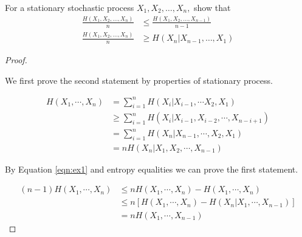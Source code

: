 \begin{exercise}{For a stationary stochastic process $X_{1}, X_{2}, \ldots, X_{n},$ show that
  $$
  \begin{aligned}
  \frac{H\left(X_{1}, X_{2}, \ldots, X_{n}\right)}{n} & \leq \frac{H\left(X_{1}, X_{2}, \ldots, X_{n-1}\right)}{n-1} \\
  \frac{H\left(X_{1}, X_{2}, \ldots, X_{n}\right)}{n} & \geq H\left(X_{n} | X_{n-1}, \ldots, X_{1}\right)
  \end{aligned}
  $$}
  \begin{proof}
  \par{~}

  We first prove the second statement by properties of stationary process.

  \begin{equation}\begin{aligned}
    H\left(X_{1}, \cdots, X_{n}\right) &=\sum_{i=1}^{n} H\left(X_{i} | X_{i-1}, \cdots X_{2}, X_{1}\right) \\
    & \geqslant \sum_{i=1}^{n} H\left(X_{i} | X_{i-1}, X_{i-2}, \cdots, X_{n-i+1}\right) \\
    &=\sum_{i=1}^{n} H\left(X_{n} | X_{n-1}, \cdots, X_{2}, X_{1}\right) \\
    &=n H\left(X_{n} | X_{1}, X_{2}, \cdots, X_{n-1}\right)
    \end{aligned}\label{eqn:ex1}\end{equation}

    By Equation \ref{eqn:ex1} and entropy equalities we can prove the first statement.

  \begin{equation}\begin{aligned}
    (n-1) H\left(X_{1}, \cdots, X_{n}\right) & \leqslant n H\left(X_{1}, \cdots, X_{n}\right)-H\left(X_{1}, \cdots, X_{n}\right) \\
    & \leqslant n\left[H\left(X_{1}, \cdots, X_{n}\right)-H\left(X_{n}|X_{1}, \cdots, X_{n-1}\right)\right]\\
    &=n H\left(X_{1}, \cdots, X_{n-1}\right)
    \end{aligned}\end{equation}


  \end{proof}
  \label{ex4-1}
\end{exercise}

